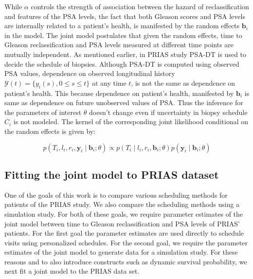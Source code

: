 While $\alpha$ controls the strength of association between the hazard of reclassification and features of the PSA levels, the fact that both Gleason scores and PSA levels are internally related to a patient's health, is manifested by the random effects $\boldsymbol{b}_i$ in the model. The joint model postulates that given the random effects, time to Gleason reclassification and PSA levels measured at different time points are mutually independent. As mentioned earlier, in PRIAS study PSA-DT is used to decide the schedule of biopsies. Although PSA-DT is computed using observed PSA values, dependence on observed longitudinal history $\mathcal{Y}(t) = \{y_i(s), 0\leq s \leq t\}$ at any time $t$, is not the same as dependence on patient's health. This because dependence on patient's health, manifested by $\boldsymbol{b}_i$ is same as dependence on future unobserved values of PSA. Thus the inference for the parameters of interest $\theta$ doesn't change even if uncertainty in biopsy schedule $C_i$ is not modeled. The kernel of the corresponding joint likelihood conditional on the random effects is given by:

\begin{equation*}
p(T_i, l_i, r_i, \boldsymbol{y}_i \mid \boldsymbol{b}_i; \theta) \propto p(T_i \mid l_i, r_i, \boldsymbol{b}_i; \theta) p(\boldsymbol{y}_i \mid \boldsymbol{b}_i; \theta)
\end{equation*}

\subsection{Fitting the joint model to PRIAS dataset}
One of the goals of this work is to compare various scheduling methods for patients of the PRIAS study. We also compare the scheduling methods using a simulation study. For both of these goals, we require parameter estimates of  the joint model between time to Gleason reclassification and PSA levels of PRIAS' patients. For the first goal the parameter estimates are used directly to schedule visits using personalized schedules. For the second goal, we require the parameter estimates of the  joint model to generate data for a simulation study. For these reasons and to also introduce constructs such as dynamic survival probability, we next fit a joint model to the PRIAS data set.\\

